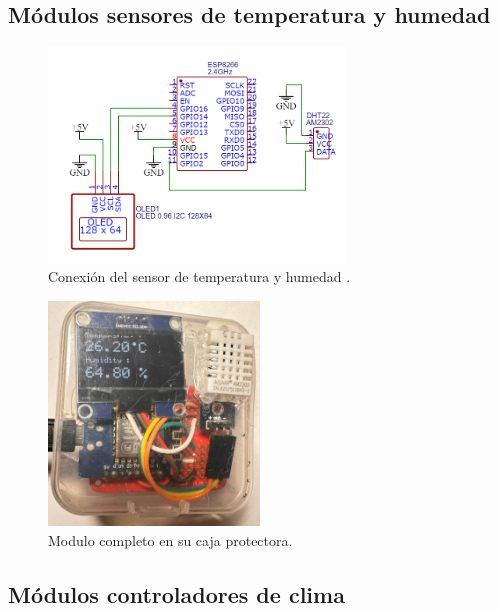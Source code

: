 \subsection{Módulos sensores de temperatura y humedad}
\label{Módulos sensores de temperatura y humedad}

\begin{figure}[!h]
	\centering
	\includegraphics[width=0.7\textwidth]{./Figures/temp_sensor.png}
	\caption[Conexión del sensor de temperatura y humedad]{Conexión del sensor de temperatura y humedad
	.}
	\label{fig:tempschem}
\end{figure}


\begin{figure}[!h]
	\centering
	\includegraphics[width=0.5\textwidth]{./Figures/sensor_temp.jpg}
	\caption[Modulo completo en su caja protectora]{Modulo completo en su caja protectora.}
	\label{fig:temp_sensor}
\end{figure}

\subsection{Módulos controladores de clima}
\label{Módulos controladores de clima}

